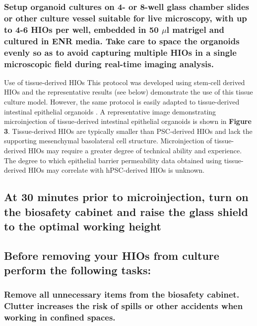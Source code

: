 \documentclass[11pt]{article}
\begin{document}
\subsubsection{{\sffamily } Setup organoid cultures on 4- or 8-well glass chamber slides or other culture vessel suitable for live microscopy, with up to 4-6 HIOs per well, embedded in 50 \(\mu\)l matrigel and cultured in ENR media. Take care to space the organoids evenly so as to avoid capturing multiple HIOs in a single microscopic field during real-time imaging analysis.}
\label{sec:orgheadline12}
\begin{bclogo}[logo=\bcinfo, couleurBarre=Black, noborder=true, couleur=gray!10]{     Use of tissue-derived HIOs}
This protocol was developed using stem-cell derived HIOs and the representative results (see below) demonstrate the use of this tissue culture model. However, the same protocol is easily adapted to tissue-derived intestinal epithelial organoids \supercite{Sato:2009,Miyoshi:2013}. A representative image demonstrating microinjection of tissue-derived intestinal epithelial organoids is shown in \textbf{Figure 3}. Tissue-derived HIOs are typically smaller than PSC-derived HIOs and lack the supporting mesenchymal basolateral cell structure\supercite{Sato:2009,Miyoshi:2013,Sato:2011}. Microinjection of tissue-derived HIOs may require a greater degree of technical ability and experience. The degree to which epithelial barrier permeability data obtained using tissue-derived HIOs may correlate with hPSC-derived HIOs is unknown.\\
\end{bclogo}

\subsection{{\sffamily } At 30 minutes prior to microinjection, turn on the biosafety cabinet and raise the glass shield to the optimal working height}
\label{sec:orgheadline14}
\subsection{{\sffamily } Before removing your HIOs from culture perform the following tasks:}
\label{sec:orgheadline41}
\subsubsection{{\sffamily } Remove all unnecessary items from the biosafety cabinet. Clutter increases the risk of spills or other accidents when working in confined spaces.}
\label{sec:orgheadline15}
\end{document}
